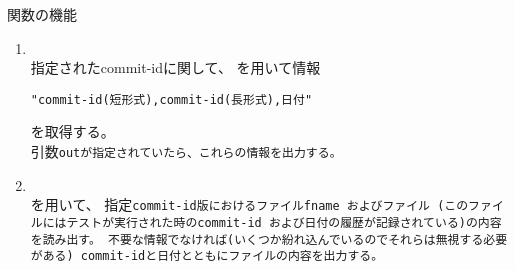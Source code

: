 \medskip
関数の機能
\begin{enumerate}
  \item	{}\\
	指定されたcommit-idに関して、
	を用いて情報
	\begin{narrow}
		\tt{"commit-id(短形式),commit-id(長形式),日付"}
	\end{narrow}
	を取得する。\\
	引数\tt{out}が指定されていたら、これらの情報を出力する。

  \item	{}\\
	を用いて、
	指定\tt{commit-id}版におけるファイル\tt{fname}
	およびファイル
	(このファイルにはテストが実行された時の\tt{commit-id}
	および日付の履歴が記録されている)の内容を読み出す。
	不要な情報でなければ(いくつか紛れ込んでいるのでそれらは無視する必要がある)
	\tt{commit-id}と日付とともにファイルの内容を出力する。
\end{enumerate}

